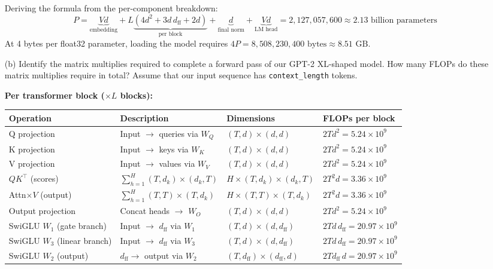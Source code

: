 \documentclass[letterpaper]{article}
\begin{document}
\begin{itemize}
	Deriving the formula from the per-component breakdown:
	\[
		P = \underbrace{Vd}_{\text{embedding}} + L\underbrace{(4d^2 + 3d\,d_\text{ff} + 2d)}_{\text{per block}} + \underbrace{d}_{\text{final norm}} + \underbrace{Vd}_{\text{LM head}}
		= 2{,}127{,}057{,}600 \approx 2.13\text{ billion parameters}
	\]
	At 4 bytes per float32 parameter, loading the model requires $4P = 8{,}508{,}230{,}400\text{ bytes} \approx 8.51\text{ GB}$.

	\item[(b)] Identify the matrix multiplies required to complete a forward pass of our GPT-2 XL-shaped model. How many FLOPs do these matrix multiplies require in total? Assume that our input sequence has \texttt{context\_length} tokens.

	\textbf{Per transformer block ($\times L$ blocks):}

	\begin{table}[H]
	\centering
	\begin{tabular}{llll}
	\hline
	\textbf{Operation} & \textbf{Description} & \textbf{Dimensions} & \textbf{FLOPs per block} \\
	\hline
	Q projection & Input $\to$ queries via $W_Q$ & $(T,d)\times(d,d)$ & $2Td^2 = 5.24\times10^9$ \\
	K projection & Input $\to$ keys via $W_K$ & $(T,d)\times(d,d)$ & $2Td^2 = 5.24\times10^9$ \\
	V projection & Input $\to$ values via $W_V$ & $(T,d)\times(d,d)$ & $2Td^2 = 5.24\times10^9$ \\
	$QK^\top$ (scores) & $\sum_{h=1}^{H} (T,d_k)\times(d_k,T)$ & $H\times(T,d_k)\times(d_k,T)$ & $2T^2d = 3.36\times10^9$ \\
	Attn$\times V$ (output) & $\sum_{h=1}^{H} (T,T)\times(T,d_k)$ & $H\times(T,T)\times(T,d_k)$ & $2T^2d = 3.36\times10^9$ \\
	Output projection & Concat heads $\to$ $W_O$ & $(T,d)\times(d,d)$ & $2Td^2 = 5.24\times10^9$ \\
	SwiGLU $W_1$ (gate branch) & Input $\to$ $d_\text{ff}$ via $W_1$ & $(T,d)\times(d,d_\text{ff})$ & $2Td\,d_\text{ff} = 20.97\times10^9$ \\
	SwiGLU $W_3$ (linear branch) & Input $\to$ $d_\text{ff}$ via $W_3$ & $(T,d)\times(d,d_\text{ff})$ & $2Td\,d_\text{ff} = 20.97\times10^9$ \\
	SwiGLU $W_2$ (output) & $d_\text{ff}\to$ output via $W_2$ & $(T,d_\text{ff})\times(d_\text{ff},d)$ & $2Td_\text{ff}\,d = 20.97\times10^9$ \\
	\hline
	\end{tabular}
	\end{table}


\end{itemize}
\end{document}
